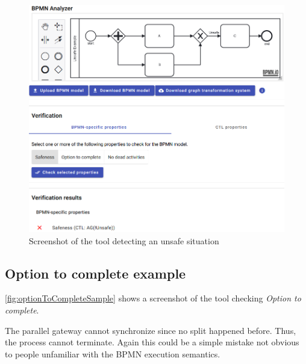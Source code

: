 \documentclass[runningheads]{llncs}
\begin{document}
\begin{figure}[ht]
    \centering
    \includegraphics[width=1\textwidth]{artifacts/unsafe_sample.png}
    \caption{Screenshot of the tool detecting an unsafe situation}
    \label{fig:unsafeSample}
\end{figure}

\subsection{Option to complete example}
\autoref{fig:optionToCompleteSample} shows a screenshot of the tool checking \textit{Option to complete}.

The parallel gateway cannot synchronize since no split happened before.
Thus, the process cannot terminate.
Again this could be a simple mistake not obvious to people unfamiliar with the BPMN execution semantics.
\end{document}
